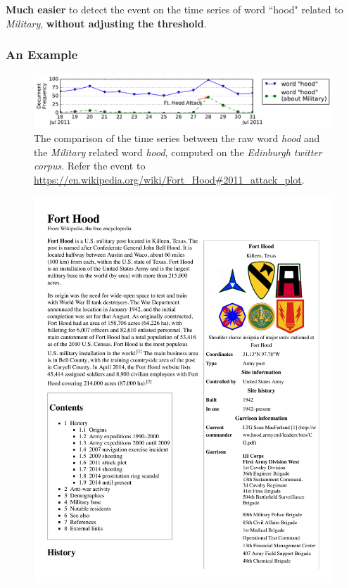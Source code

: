 \documentclass{beamer}
\begin{document}
\begin{frame}
\textbf{Much easier} to detect the event on the time series of word ``hood" related to \textit{Military}, \textbf{without adjusting the threshold}.
\frametitle{An Example}	
\begin{figure}[h]
		\setlength{\abovecaptionskip}{0.cm}
        \setlength{\belowcaptionskip}{0.cm}
        \centering
        \includegraphics[width=1.0\columnwidth]{../img/hood.pdf}
        \caption{The comparison of the time series between the raw word \textit{hood} and the \textit{Military} related word \textit{hood}, computed on the \textit{Edinburgh twitter corpus}. Refer the event to \url{https://en.wikipedia.org/wiki/Fort_Hood\#2011_attack_plot}.}
        \label{fig:hood}
\end{figure}

\begin{figure}[h]
		\setlength{\abovecaptionskip}{0.cm}
        \setlength{\belowcaptionskip}{0.cm}
        \centering
        \includegraphics[width=0.5\columnwidth, left]{Fort_Hood.pdf}
\end{figure}
\end{frame}
\end{document}
